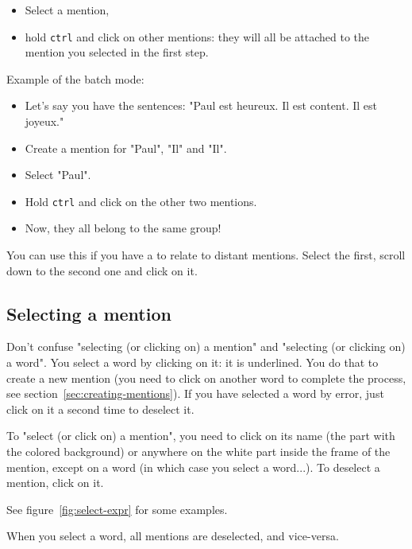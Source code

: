\documentclass[12pt]{article}
\begin{document}
\begin{itemize}
   \item Select a mention,
   \item hold \verb|ctrl| and click on other mentions: they will all be
   attached to the mention you selected in the first step.
\end{itemize}

Example of the batch mode:
\begin{itemize}
   \item Let's say you have the sentences: "Paul est heureux.  Il est
   content. Il est joyeux."
   \item Create a mention for "Paul", "Il" and "Il".
   \item Select "Paul".
   \item Hold \verb|ctrl| and click on the other two mentions.
   \item Now, they all belong to the same group!
\end{itemize}

You can use this if you have a to relate to distant mentions.  Select the
first, scroll down to the second one and click on it.

 \subsection{Selecting a mention}

Don't confuse "selecting (or clicking on) a mention" and "selecting (or
clicking on) a word".  You select a word by clicking on it: it is underlined.
You do that to create a new mention (you need to click on another word to
complete the process, see section~\ref{sec:creating-mentions}).  If you have
selected a word by error, just click on it a second time to deselect it.

To "select (or click on) a mention", you need to click on its name (the part
with the colored background) or anywhere on the white part inside the frame
of the mention, except on a word (in which case you select a word...).  To
deselect a mention, click on it.

See figure~\ref{fig:select-expr} for some examples.

When you select a word, all mentions are deselected, and vice-versa.
\end{document}
